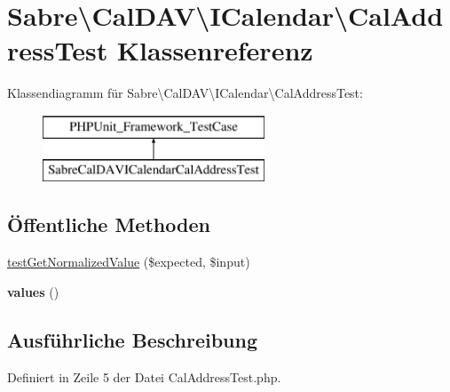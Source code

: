 \hypertarget{class_sabre_1_1_v_object_1_1_property_1_1_i_calendar_1_1_cal_address_test}{}\section{Sabre\textbackslash{}Cal\+D\+AV\textbackslash{}I\+Calendar\textbackslash{}Cal\+Address\+Test Klassenreferenz}
\label{class_sabre_1_1_v_object_1_1_property_1_1_i_calendar_1_1_cal_address_test}
Klassendiagramm für Sabre\textbackslash{}Cal\+D\+AV\textbackslash{}I\+Calendar\textbackslash{}Cal\+Address\+Test\+:\begin{figure}[H]
\begin{center}
\leavevmode
\includegraphics[height=2.000000cm]{class_sabre_1_1_v_object_1_1_property_1_1_i_calendar_1_1_cal_address_test}
\end{center}
\end{figure}
\subsection*{Öffentliche Methoden}
\begin{DoxyCompactItemize}
\item 
\mbox{\hyperlink{class_sabre_1_1_v_object_1_1_property_1_1_i_calendar_1_1_cal_address_test_aeabce224617b183f70e7851ad3149c23}{test\+Get\+Normalized\+Value}} (\$expected, \$input)
\item 
\mbox{\label{class_sabre_1_1_v_object_1_1_property_1_1_i_calendar_1_1_cal_address_test_a15ee5374374660d134d3a20ab49ba9d9}} 
{\bfseries values} ()
\end{DoxyCompactItemize}


\subsection{Ausführliche Beschreibung}


Definiert in Zeile 5 der Datei Cal\+Address\+Test.\+php.



